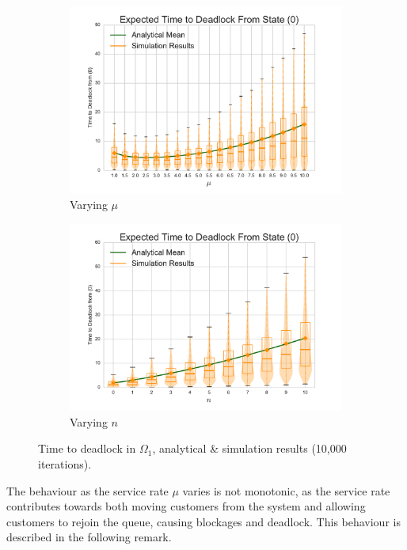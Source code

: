\documentclass{article}
\numberwithin{equation}{section}
\begin{document}
\begin{figure}[!htbp]
\begin{center}
\begin{subfigure}[b]{0.35\textwidth}
  \includegraphics[width=\textwidth]{images/varymu}
  \caption{Varying $\mu$}
  \label{fig:timestodeadlock_mu}
\end{subfigure}
\begin{subfigure}[b]{0.35\textwidth}
  \includegraphics[width=\textwidth]{images/varyn}
  \caption{Varying $n$}
  \label{fig:timestodeadlock_n}
\end{subfigure}
\end{center}
\caption{Time to deadlock in $\Omega_1$, analytical \& simulation results (10,000 iterations).}
\label{fig:timestodeadlock}
\end{figure}

The behaviour as the service rate $\mu$ varies is not monotonic, as the service rate contributes towards both moving customers from the system and allowing customers to rejoin the queue, causing blockages and deadlock.
This behaviour is described in the following remark.\\
\end{document}
